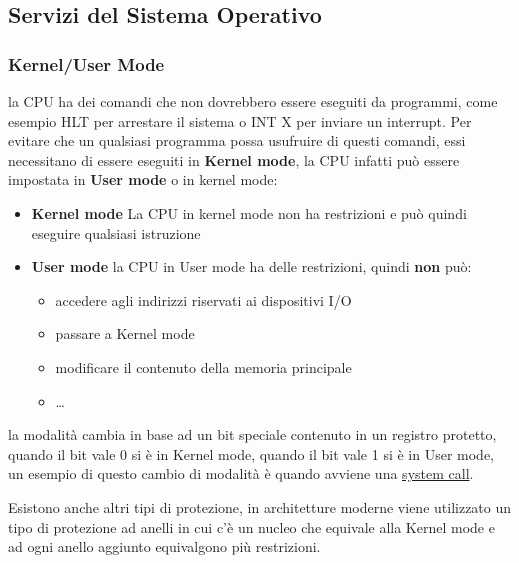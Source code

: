 \documentclass{article}
\begin{document}
    \subsection{Servizi del Sistema Operativo}
        \subsubsection{Kernel/User Mode}
            la CPU ha dei comandi che non dovrebbero essere eseguiti da programmi, come esempio HLT per arrestare il sistema o INT X per inviare un interrupt.
            Per evitare che un qualsiasi programma possa usufruire di questi comandi, essi necessitano di essere eseguiti in \textbf{Kernel mode}, la CPU infatti può essere impostata in \textbf{User mode} o in kernel mode:

            \begin{itemize}
                \item \textbf{Kernel mode}
                La CPU in kernel mode non ha restrizioni e può quindi eseguire qualsiasi istruzione

                \item \textbf{User mode}
                la CPU in User mode ha delle restrizioni, quindi \textbf{non} può:

                    \begin{itemize}
                        \item accedere agli indirizzi riservati ai dispositivi I/O
                        \item passare a Kernel mode
                        \item modificare il contenuto della memoria principale
                        \item \ldots
                    \end{itemize}

            \end{itemize}
        la modalità cambia in base ad un bit speciale contenuto in un registro protetto, quando il bit vale 0 si è in Kernel mode, quando il bit vale 1 si è in User mode, un esempio di questo cambio di modalità è quando avviene una \hyperref[sec:syscall]{system call}.
        
        Esistono anche altri tipi di protezione, in architetture moderne viene utilizzato un tipo di protezione ad anelli in cui c'è un nucleo che equivale alla Kernel mode e ad ogni anello aggiunto equivalgono più restrizioni.
\end{document}
